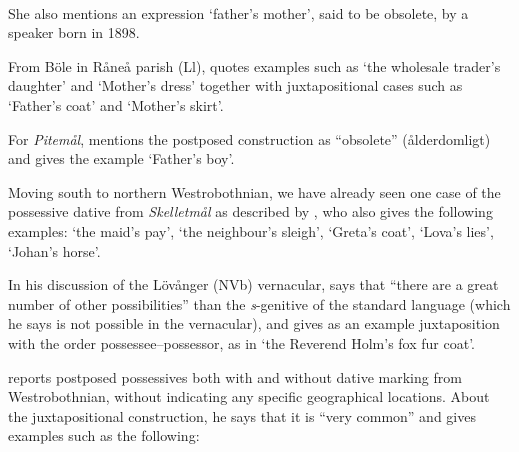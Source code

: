 \ea%
\\

\z 
\z

She also mentions an expression  ‘father’s mother’, said to be obsolete, by a speaker born in 1898.

From Böle in Råneå parish (Ll), \citet[113]{Wikberg2004} quotes examples such as  ‘the wholesale trader’s daughter’ and  ‘Mother’s dress’ together with juxtapositional cases such as  ‘Father’s coat’ and  ‘Mother’s skirt’.

For \textit{Pitemål}, \citet[11]{Brännström1993} mentions the postposed construction as “obsolete” (ålderdomligt) and gives the example  ‘Father’s boy’. 

Moving south to northern Westrobothnian, we have already seen one case of the possessive dative from \textit{Skelletmål} as described by \citet[22]{Marklund1976}, who also gives the following examples:  ‘the maid’s pay’,  ‘the neighbour’s sleigh’,  ‘Greta’s coat’,  ‘Lova’s lies’, ‘Johan’s horse’. 

In his discussion of the Lövånger (NVb) vernacular, \citet[208]{Holm1942} says that “there are a great number of other possibilities” than the \textit{s}{}-genitive of the standard language (which he says is not possible in the vernacular), and gives as an example juxtaposition with the order possessee–possessor, as in  ‘the Reverend Holm’s fox fur coat’. 

\citet[125]{Larsson1929} reports postposed possessives both with and without dative marking from Westrobothnian, without indicating any specific geographical locations. About the juxtapositional construction, he says that it is “very common” and gives examples such as the following:

